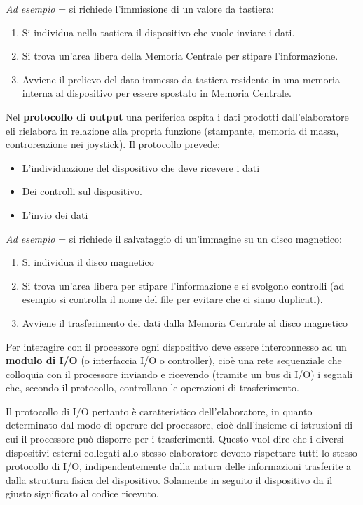 \documentclass[12pt]{article}
\begin{document}
\textit{Ad esempio} = si richiede l’immissione di un valore da tastiera:
\begin{enumerate}
    \item Si individua nella tastiera il dispositivo che vuole inviare i dati.
    \item Si trova un’area libera della Memoria Centrale per stipare l’informazione.
    \item Avviene il prelievo del dato immesso da tastiera residente in una memoria interna al dispositivo per essere spostato in Memoria Centrale.
\end{enumerate}
\newpage \noindent Nel \textbf{protocollo di output} una periferica ospita i dati prodotti dall’elaboratore eli rielabora in relazione alla propria funzione (stampante, memoria di massa, controreazione nei joystick).
Il protocollo prevede:
\begin{itemize}
    \item L’individuazione del dispositivo che deve ricevere i dati
    \item Dei controlli sul dispositivo.
    \item L’invio dei dati\par\medskip\noindent
\end{itemize}
\textit{Ad esempio} = si richiede il salvataggio di un'immagine su un disco magnetico:
\begin{enumerate}
    \item Si individua il disco magnetico
    \item Si trova un’area libera per stipare l’informazione e si svolgono controlli (ad esempio si controlla il nome del file per evitare che ci siano duplicati).
    \item Avviene il trasferimento dei dati dalla Memoria Centrale al disco magnetico
\end{enumerate}
Per interagire con il processore ogni dispositivo deve essere interconnesso ad un \textbf{modulo di I/O} (o interfaccia I/O o controller), cioè una rete sequenziale che colloquia con il processore inviando e ricevendo (tramite un bus di I/O) i segnali che, secondo il protocollo, controllano le operazioni di trasferimento.\par\medskip\noindent
Il protocollo di I/O pertanto è caratteristico dell’elaboratore, in quanto determinato dal modo di operare del processore, cioè dall’insieme di istruzioni di cui il processore può disporre per i trasferimenti. Questo vuol dire che i diversi dispositivi esterni collegati allo stesso elaboratore devono rispettare tutti lo stesso protocollo di I/O, indipendentemente dalla natura delle informazioni trasferite a dalla struttura fisica del dispositivo. Solamente in seguito il dispositivo da il giusto significato al codice ricevuto. \par\medskip\noindent
\end{document}
